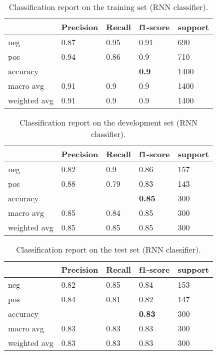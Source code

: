 \documentclass[10pt, a4paper]{article}
\begin{document}
	\begin{table}
		\begin{tabular}{|l|l|l|l|l|}
			\hline
			\cellcolor{blue!25}\textbf{} & \cellcolor{blue!25}\textbf{Precision} &
			\cellcolor{blue!25}\textbf{Recall}  &
			\cellcolor{blue!25}\textbf{f1-score}  &
			\cellcolor{blue!25}\textbf{support}\\
			\hline
			neg & 0.87 & 0.95 & 0.91 & 690 \\\hline
			pos & 0.94  & 0.86 & 0.9 & 710 \\\hline
			accuracy & & & \textbf{0.9} & 1400 \\\hline
			macro avg & 0.91 & 0.9 & 0.9 & 1400 \\\hline
			weighted avg & 0.91 & 0.9 & 0.9 & 1400 \\\hline
			
		\end{tabular}
		\centering
		\caption{Classification report on the training set (RNN classifier).}
		\label{tab::ex-1-report-train}
	\end{table}
	
	\begin{table}
		\begin{tabular}{|l|l|l|l|l|}
			\hline
			\cellcolor{blue!25}\textbf{} & \cellcolor{blue!25}\textbf{Precision} &
			\cellcolor{blue!25}\textbf{Recall}  &
			\cellcolor{blue!25}\textbf{f1-score}  &
			\cellcolor{blue!25}\textbf{support}\\
			\hline
			neg & 0.82 & 0.9 & 0.86 & 157 \\\hline
			pos & 0.88  & 0.79 & 0.83 & 143 \\\hline
			accuracy & & & \textbf{0.85} & 300 \\\hline
			macro avg & 0.85 & 0.84 & 0.85 & 300 \\\hline
			weighted avg & 0.85 & 0.85 & 0.85 & 300 \\\hline
			
		\end{tabular}
		\centering
		\caption{Classification report on the development set (RNN classifier).}
		\label{tab::ex-1-report-dev}
	\end{table}
	
	\begin{table}
		\begin{tabular}{|l|l|l|l|l|}
			\hline
			\cellcolor{blue!25}\textbf{} & \cellcolor{blue!25}\textbf{Precision} &
			\cellcolor{blue!25}\textbf{Recall}  &
			\cellcolor{blue!25}\textbf{f1-score}  &
			\cellcolor{blue!25}\textbf{support}\\
			\hline
			neg & 0.82 & 0.85 & 0.84 & 153 \\\hline
			pos & 0.84  & 0.81 & 0.82 & 147 \\\hline
			accuracy & & & \textbf{0.83} & 300 \\\hline
			macro avg & 0.83 & 0.83 & 0.83 & 300 \\\hline
			weighted avg & 0.83 & 0.83 & 0.83 & 300 \\\hline
			
		\end{tabular}
		\centering
		\caption{Classification report on the test set (RNN classifier).}
		\label{tab::ex-1-report-test}
	\end{table}
	
\end{document}
